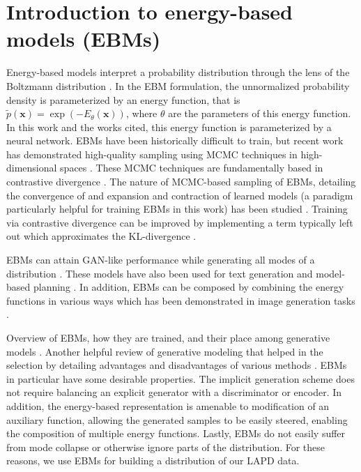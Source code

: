\section{Introduction to energy-based models (EBMs)}

Energy-based models interpret a probability distribution through the lens of the Boltzmann distribution \cite{hopfield_neural_1982, ackley_learning_1985, lecun_tutorial_2006}. In the EBM formulation, the unnormalized probability density is parameterized by an energy function, that is $\tilde{p}(\mathbf{x}) = \exp(-E_\theta(\mathbf{x}))$, where $\theta$ are the parameters of this energy function. In this work and the works cited, this energy function is parameterized by a neural network. EBMs have been historically difficult to train, but recent work has demonstrated high-quality sampling using MCMC techniques in high-dimensional spaces \cite{du_model_2019, du_implicit_2020, du_improved_2021, du_compositional_2020, du_unsupervised_2021, nijkamp_anatomy_2020, nijkamp_learning_2019, deng_residual_2020, gao_learning_2018}. These MCMC techniques are fundamentally based in contrastive divergence \cite{hinton_training_2002, ruslan_deep_2009, tieleman_training_2008}. The nature of MCMC-based sampling of EBMs, detailing the convergence of and expansion and contraction of learned models (a paradigm particularly helpful for training EBMs in this work) has been studied \cite{nijkamp_anatomy_2020, nijkamp_learning_2019}. Training via contrastive divergence can be improved by implementing a term typically left out which approximates the KL-divergence \cite{du_improved_2021}. 

EBMs can attain GAN-like performance while generating all modes of a distribution \cite{du_implicit_2020}. These models have also been used for text generation \cite{deng_residual_2020} and model-based planning \cite{du_model_2019}. In addition, EBMs can be composed by combining the energy functions in various ways which has been demonstrated in image generation tasks \cite{du_compositional_2020, du_unsupervised_2021}.

Overview of EBMs, how they are trained, and their place among generative models \cite{carbone_hitchhikers_2024}. Another helpful review of generative modeling that helped in the selection by detailing advantages and disadvantages of various methods \cite{bond-taylor_deep_2021}. EBMs in particular have some desirable properties. The implicit generation scheme does not require balancing an explicit generator with a discriminator or encoder. In addition, the energy-based representation is amenable to modification of an auxiliary function, allowing the generated samples to be easily steered, enabling the composition of multiple energy functions. Lastly, EBMs do not easily suffer from mode collapse or otherwise ignore parts of the distribution. For these reasons, we use EBMs for building a distribution of our LAPD data.

